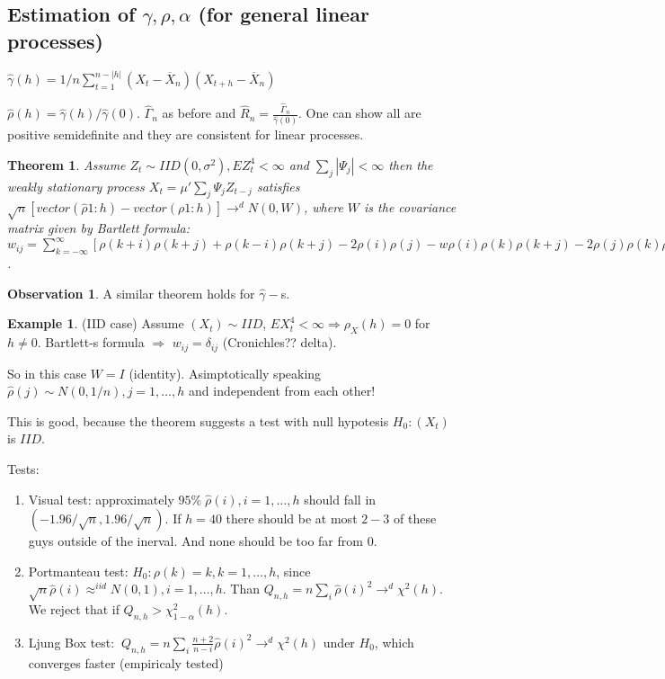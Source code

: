 \documentclass[12pt,a4paper]{amsart}
\theoremstyle{definition} %
\newtheorem{example}[defn]{Example}
\newtheorem{observation}[defn]{Observation}
\theoremstyle{plain} %
\newtheorem{theorem}[defn]{Theorem}
\begin{document}
\subsection{Estimation of $\gamma, \rho, \alpha$ (for general linear processes)}

$\hat{\gamma}(h) = 1/n \sum_{t = 1}^{n - |h|} (X_t - \overline{X}_n)(X_{t+h}-\overline{X}_n)$

$\hat{\rho}(h) = \hat{\gamma}(h) / \hat{\gamma}(0)$. $\hat{\Gamma}_n$ as before and $\hat{R}_n = \frac{\hat{\Gamma}_n}{\hat{\gamma}(0)}$. One can show all are positive semidefinite and they are consistent for linear processes.

\begin{theorem}
Assume $Z_t \sim IID(0, \sigma^2), EZ_t^4 < \infty$ and $\sum_j |\Psi_j| < \infty$ then the weakly stationary process 
$X_t = \mu ' \sum_j \Psi_j Z_{t-j}$
satisfies
$\sqrt{n} [vector(\hat{\rho}1:h) - vector(\rho 1:h)] \rightarrow^d N(0,W)$, where $W$ is the covariance matrix given by Bartlett formula:
$w_{i j} = \sum_{k = -\infty}^\infty [\rho(k + i)\rho(k+j) + \rho(k-i)\rho(k+j)-2\rho(i)\rho(j)-w\rho(i)\rho(k)\rho(k+j) - 2\rho(j)\rho(k)\rho(k+i)]$.

\end{theorem}


\begin{observation}
A similar theorem holds for $\hat{\gamma}-$s. 
\end{observation}


\begin{example}(IID case)
Assume $(X_t) \sim IID$, $EX_t^4 < \infty \Rightarrow \rho_X(h) = 0$ for $h \neq 0$. Bartlett-s formula $\Rightarrow$
$w_{ij} = \delta_{ij}$ (Cronichles?? delta).

So in this case $W = I$ (identity). Asimptotically speaking $\hat{\rho}(j) \sim N(0, 1/n), j=1, \dots, h$ and independent from each other! 
\end{example}

This is good, because the theorem suggests a test with null hypotesis $H_0: (X_t)$ is $ IID$.

Tests:
\begin{enumerate}
\item Visual test: approximately $95\%\; \hat{\rho}(i), i = 1, \dots, h$ should fall in $ (-1.96/\sqrt{n},1.96/\sqrt{n})$. If $h = 40$ there should be at most $2-3$ of these guys outside of the inerval. And none should be too far from $0$.
\item Portmanteau test: $H_0: \rho(k) = k, k = 1, \dots, h$, since $\sqrt{n}\hat{\rho}(i) \approx^{iid} N(0,1), i = 1, \dots, h$. Than $Q_{n,h} = n \sum_i \hat{\rho}(i)^2 \rightarrow^d \chi^2(h)$. We reject that if $Q_{n,h} > \chi^2_{1-\alpha}(h)$.
\item Ljung Box test: $~Q_{n, h} = n \sum_i \frac{n+2}{n-i}\hat{\rho}(i)^2 \rightarrow^d \chi^2(h)$ under $H_0$, which converges faster (empiricaly tested)
\end{enumerate}
\end{document}
